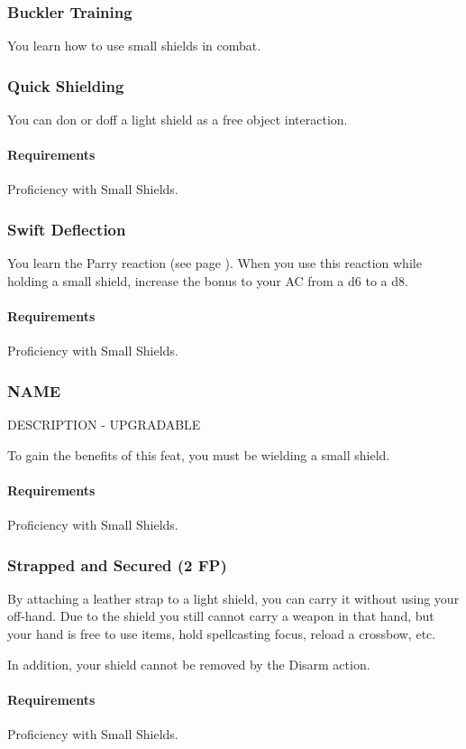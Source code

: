\subsubsection{Buckler Training} \label{feat::bucklertraining}
    You learn how to use small shields in combat.
\subsubsection{Quick Shielding} \label{feat::quickshielding}
    You can don or doff a light shield as a free object interaction.
    \paragraph{Requirements} Proficiency with Small Shields.
\subsubsection{Swift Deflection} \label{feat::swiftdeflection}
    You learn the Parry reaction (see page \pageref{act::parry}).
    When you use this reaction while holding a small shield, increase the bonus to your AC from a d6 to a d8.
    \paragraph{Requirements} Proficiency with Small Shields.
\subsubsection{NAME} \label{feat::name}
    DESCRIPTION - UPGRADABLE

    To gain the benefits of this feat, you must be wielding a small shield.
    \paragraph{Requirements} Proficiency with Small Shields.
\subsubsection{Strapped and Secured (2 FP)} \label{feat::strappedandsecured}
    By attaching a leather strap to a light shield, you can carry it without using your off-hand.
    Due to the shield you still cannot carry a weapon in that hand, but your hand is free to use items, hold spellcasting focus, reload a crossbow, etc.

    In addition, your shield cannot be removed by the Disarm action.
    \paragraph{Requirements} Proficiency with Small Shields.
